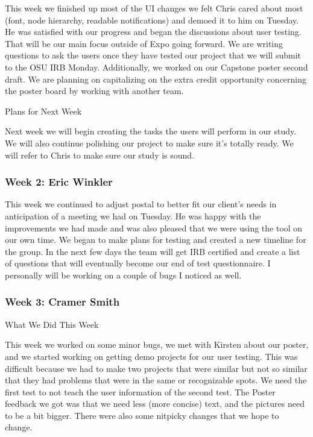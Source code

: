 This week we finished up most of the UI changes we felt Chris cared about most (font, node hierarchy, readable notifications) and demoed it to him on Tuesday. He was satisfied with our progress and began the discussions about user testing. That will be our main focus outside of Expo going forward. We are writing questions to ask the users once they have tested our project that we will submit to the OSU IRB Monday. Additionally, we worked on our Capstone poster second draft. We are planning on capitalizing on the extra credit opportunity concerning the poster board by working with another team.



Plans for Next Week

Next week we will begin creating the tasks the users will perform in our study. We will also continue polishing our project to make sure it's totally ready. We will refer to Chris to make sure our study is sound. \\ 

 \subsubsection{Week 2: Eric Winkler}

This week we continued to adjust postal to better fit our client's needs in anticipation of a meeting we had on Tuesday. He was happy with the improvements we had made and was also pleased that we were using the tool on our own time. We began to make plans for testing and created a new timeline for the group. In the next few days the team will get IRB certified and create a list of questions that will eventually become our end of test questionnaire. I personally will be working on a couple of bugs I noticed as well. \\ 

 \subsubsection{Week 3: Cramer Smith}

What We Did This Week



This week we worked on some minor bugs, we met with Kirsten about our poster, and we started working on getting demo projects for our user testing. This was difficult because we had to make two projects that were similar but not so similar that they had problems that were in the same or recognizable spots. We need the first test to not teach the user information of the second test. The Poster feedback we got was that we need less (more concise) text, and the pictures need to be a bit bigger. There were also some nitpicky changes that we hope to change.



